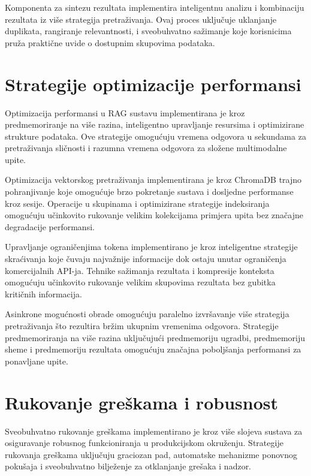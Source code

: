 Komponenta za sintezu rezultata implementira inteligentnu analizu i kombinaciju rezultata iz više strategija pretraživanja. Ovaj proces uključuje uklanjanje duplikata, rangiranje relevantnosti, i sveobuhvatno sažimanje koje korisnicima pruža praktične uvide o dostupnim skupovima podataka.

\section{Strategije optimizacije performansi}
\label{sec:performance_optimization}

Optimizacija performansi u RAG sustavu implementirana je kroz predmemoriranje na više razina, inteligentno upravljanje resursima i optimizirane strukture podataka. Ove strategije omogućuju vremena odgovora u sekundama za pretraživanja sličnosti i razumna vremena odgovora za složene multimodalne upite.

Optimizacija vektorskog pretraživanja implementirana je kroz ChromaDB trajno pohranjivanje koje omogućuje brzo pokretanje sustava i dosljedne performanse kroz sesije. Operacije u skupinama i optimizirane strategije indeksiranja omogućuju učinkovito rukovanje velikim kolekcijama primjera upita bez značajne degradacije performansi.

Upravljanje ograničenjima tokena implementirano je kroz inteligentne strategije skraćivanja koje čuvaju najvažnije informacije dok ostaju unutar ograničenja komercijalnih API-ja. Tehnike sažimanja rezultata i kompresije konteksta omogućuju učinkovito rukovanje velikim skupovima rezultata bez gubitka kritičnih informacija.

Asinkrone mogućnosti obrade omogućuju paralelno izvršavanje više strategija pretraživanja što rezultira bržim ukupnim vremenima odgovora. Strategije predmemoriranja na više razina uključujući predmemoriju ugradbi, predmemoriju sheme i predmemoriju rezultata omogućuju značajna poboljšanja performansi za ponavljane upite.

\section{Rukovanje greškama i robusnost}
\label{sec:error_handling}

Sveobuhvatno rukovanje greškama implementirano je kroz više slojeva sustava za osiguravanje robusnog funkcioniranja u produkcijskom okruženju. Strategije rukovanja greškama uključuju graciozan pad, automatske mehanizme ponovnog pokušaja i sveobuhvatno bilježenje za otklanjanje grešaka i nadzor.

